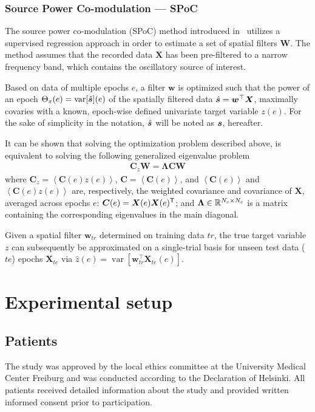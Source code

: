 \documentclass[10pt,a4paper, twocolumn]{article}
\providecommand{\mat}[1]{{\bm {#1}}}
\begin{document}
\subsubsection{Source Power Co-modulation --- SPoC}
\label{par:spoc}
The source power co-modulation (SPoC) method introduced in~\cite{dahne2014spoc} utilizes a supervised regression approach in order to estimate a set of spatial filters $\mat{W}$. The method assumes that the recorded data $\mat{X}$ has been pre-filtered to a narrow frequency band, which contains the oscillatory source of interest. 

Based on data of multiple epochs $e$, a filter $\mat{w}$ is optimized such that the power of an epoch $\Theta_x(e) = \operatorname{var}[\hat{{\bm {s}}}](e)$ of the spatially filtered data $\hat{\ve{s}}=\mat{w}^\top\mat{X}$, maximally covaries with a known, epoch-wise defined univariate target variable $z(e)$. For the sake of simplicity in the notation, $\hat{{\bm {s}}}$ will be noted as ${\bm {s}}$, hereafter.
 
It can be shown that solving the optimization problem described above, is equivalent to solving the following generalized eigenvalue problem
\begin{align}\label{eq:eig_spoc}
\mat{C}_z\mat{W} = \mat{\Lambda}\mat{C}\mat{W}
\end{align}
where $\mat{C}_z = \left<\mat{C}(e)z(e)\right>$, $\mat{C} = \left<\mat{C}(e)\right>$, and $\left<\mat{C}(e)\right>$ and $\left<\mat{C}(e)z(e)\right>$ are, respectively, the weighted covariance and covariance of $\mat{X}$, averaged across epochs $e$: $\mat{C}(e) = \mat{X}(e)\mat{X}(e)^\T$; and $\mat{\Lambda} \in \Real^{N_c\times N_c}$ is a matrix containing the corresponding eigenvalues in the main diagonal.

Given a spatial filter $\mat{w}_{tr}$ determined on training data $tr$, the true target variable $z$ can subsequently be approximated on a single-trial basis for unseen test data ($te$) epochs $\mat{X}_{te}$ via $\hat{z}(e) = \operatorname{var}[\mat{w}_{tr}^\top\mat{X}_{te}(e)]$. 


\section{Experimental setup}
\subsection{Patients}
The study was approved by the local ethics committee at the University Medical Center Freiburg and was conducted according to the Declaration of Helsinki. All patients received detailed information about the study and provided written informed consent prior to participation.
\end{document}
